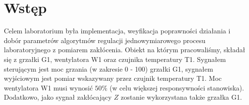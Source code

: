 \chapter{Wstęp}
Celem laboratorium była implementacja, weyfikacja poprawności działania i dobór
parametrów algorytmów regulacji jednowymiarowego procesu laboratoryjnego
z pomiarem zakłócenia. Obiekt na którym pracowaliśmy, składał się z grzałki G1,
wentylatora W1 oraz czujnika temperatury T1. Sygnałem sterującym jest moc grzania (w zakresie 0 - 100)
grzałki G1, sygnałem wyjściowym jest pomiar wskazywany przez czujnik temperatury T1.
Moc wentylatora W1 musi wynosić $50\%$ (w celu większej responsywności stanowiska).
Dodatkowo, jako sygnał zakłócający $Z$ zostanie wykorzystana także grzałka G1.
